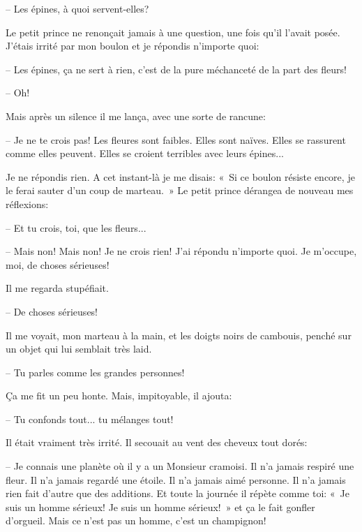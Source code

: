 \documentclass[a4paper]{report}
\begin{document}
-- Les épines, à quoi servent-elles?

Le petit prince ne renonçait jamais à une question, une fois qu'il l'avait posée. J'étais irrité par mon boulon et je répondis n'importe quoi:

-- Les épines, ça ne sert à rien, c'est de la pure méchanceté de la part des fleurs!

-- Oh!

Mais après un silence il me lança, avec une sorte de rancune:

-- Je ne te crois pas! Les fleures sont faibles. Elles sont naïves. Elles se rassurent comme elles peuvent. Elles se croient terribles avec leurs épines...

Je ne répondis rien. A cet instant-là je me disais: «~Si ce boulon résiste encore, je le ferai sauter d'un coup de marteau.~» Le petit prince dérangea de nouveau mes réflexions:

-- Et tu crois, toi, que les fleurs...

-- Mais non! Mais non! Je ne crois rien! J'ai répondu n'importe quoi. Je m'occupe, moi, de choses sérieuses!

Il me regarda stupéfiait.

-- De choses sérieuses!

Il me voyait, mon marteau à la main, et les doigts noirs de cambouis, penché sur un objet qui lui semblait très laid.

-- Tu parles comme les grandes personnes!

Ça me fit un peu honte. Mais, impitoyable, il ajouta:

-- Tu confonds tout... tu mélanges tout!

Il était vraiment très irrité. Il secouait au vent des cheveux tout dorés:

-- Je connais une planète où il y a un Monsieur cramoisi. Il n'a jamais respiré une fleur. Il n'a jamais regardé une étoile. Il n'a jamais aimé personne. Il n'a jamais rien fait d'autre que des additions. Et toute la journée il répète comme toi: «~Je suis un homme sérieux! Je suis un homme sérieux!~» et ça le fait gonfler d'orgueil. Mais ce n'est pas un homme, c'est un champignon! 
\end{document}
